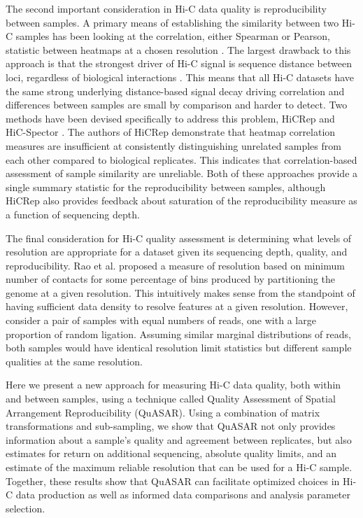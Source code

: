 The second important consideration in Hi-C data quality is reproducibility between samples. A primary means of establishing the similarity between two Hi-C samples has been looking at the correlation, either Spearman or Pearson, statistic between heatmaps at a chosen resolution \cite{hou_gene_2012,battulin_comparison_2015,crane_condensin-driven_2015,li_widespread_2015,nagano_comparison_2015,rao_3d_2014}. The largest drawback to this approach is that the strongest driver of Hi-C signal is sequence distance between loci, regardless of biological interactions \cite{lieberman-aiden_comprehensive_2009}. This means that all Hi-C datasets have the same strong underlying distance-based signal decay driving correlation and differences between samples are small by comparison and harder to detect. Two methods have been devised specifically to address this problem, HiCRep \cite{yang_hicrep:_2017} and HiC-Spector \cite{yan_hic-spector:_2017}. The authors of HiCRep demonstrate that heatmap correlation measures are insufficient at consistently distinguishing unrelated samples from each other compared to biological replicates. This indicates that correlation-based assessment of sample similarity are unreliable. Both of these approaches provide a single summary statistic for the reproducibility between samples, although HiCRep also provides feedback about saturation of the reproducibility measure as a function of sequencing depth.

The final consideration for Hi-C quality assessment is determining what levels of resolution are appropriate for a dataset given its sequencing depth, quality, and reproducibility. Rao et al. \cite{rao_3d_2014} proposed a measure of resolution based on minimum number of contacts for some percentage of bins produced by partitioning the genome at a given resolution. This intuitively makes sense from the standpoint of having sufficient data density to resolve features at a given resolution. However, consider a pair of samples with equal numbers of reads, one with a large proportion of random ligation. Assuming similar marginal distributions of reads, both samples would have identical resolution limit statistics but different sample qualities at the same resolution.

Here we present a new approach for measuring Hi-C data quality, both within and between samples, using a technique called Quality Assessment of Spatial Arrangement Reproducibility (QuASAR). Using a combination of matrix transformations and sub-sampling, we show that QuASAR not only provides information about a sample's quality and agreement between replicates, but also estimates for return on additional sequencing, absolute quality limits, and an estimate of the maximum reliable resolution that can be used for a Hi-C sample. Together, these results show that QuASAR can facilitate optimized choices in Hi-C data production as well as informed data comparisons and analysis parameter selection.

